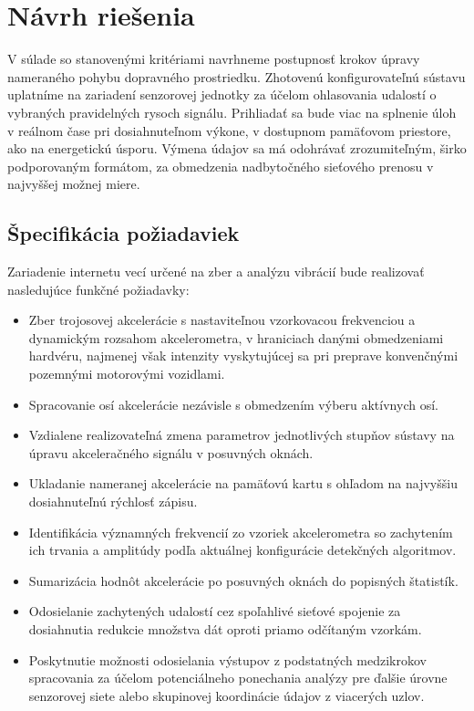 \chapter{Návrh riešenia}
V súlade so stanovenými kritériami navrhneme postupnosť krokov úpravy nameraného pohybu dopravného prostriedku. 
Zhotovenú konfigurovateľnú sústavu uplatníme na zariadení senzorovej jednotky za účelom ohlasovania udalostí 
o vybraných pravidelných rysoch signálu. Prihliadať sa bude viac na splnenie úloh v reálnom čase pri
dosiahnuteľnom výkone, v dostupnom pamäťovom priestore, ako na energetickú úsporu. Výmena údajov sa má 
odohrávať zrozumiteľným, širko podporovaným formátom, za obmedzenia nadbytočného sieťového prenosu 
v najvyššej možnej miere.


\section{Špecifikácia požiadaviek}
Zariadenie internetu vecí určené na zber a analýzu vibrácií bude realizovať nasledujúce funkčné požiadavky: 
\begin{itemize}[noitemsep,topsep=0pt]
\item Zber trojosovej akcelerácie s nastaviteľnou vzorkovacou frekvenciou a dynamickým rozsahom akcelerometra, v hraniciach danými 
obmedzeniami hardvéru, najmenej však intenzity vyskytujúcej sa pri preprave konvenčnými pozemnými motorovými vozidlami.
\item Spracovanie osí akcelerácie nezávisle s obmedzením výberu aktívnych osí.
\item Vzdialene realizovateľná zmena parametrov jednotlivých stupňov sústavy na úpravu akceleračného signálu v posuvných oknách.
\item Ukladanie nameranej akcelerácie na pamäťovú kartu s ohľadom na najvyššiu dosiahnuteľnú rýchlosť zápisu.
\item Identifikácia významných frekvencií zo vzoriek akcelerometra so zachytením ich trvania a amplitúdy podľa aktuálnej 
konfigurácie detekčných algoritmov.
\item Sumarizácia hodnôt akcelerácie po posuvných oknách do popisných štatistík.
\item Odosielanie zachytených udalostí cez spoľahlivé sieťové spojenie za dosiahnutia redukcie množstva dát oproti priamo odčítaným vzorkám. 
\item Poskytnutie možnosti odosielania výstupov z podstatných medzikrokov spracovania za účelom potenciálneho ponechania 
analýzy pre ďalšie úrovne senzorovej siete alebo skupinovej koordinácie údajov z viacerých uzlov. 
\end{itemize}
\bigskip

